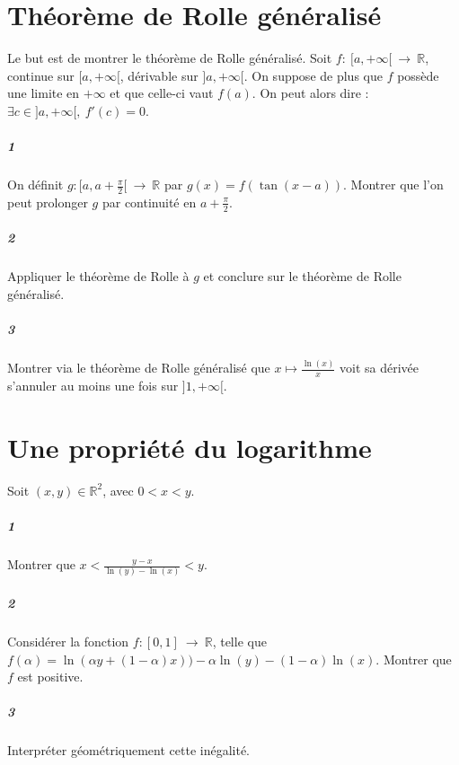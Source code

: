 \documentclass[10pt,a4paper]{article}
\begin{document}
\section{Théorème de Rolle généralisé}
Le but est de montrer le théorème de Rolle généralisé. Soit $f: \ [a,+\infty[ \ \rightarrow \ \mathbb{R}$, continue sur $[a,+\infty[$, dérivable sur $]a,+\infty[$. On suppose de plus que $f$ possède une limite en $+\infty$ et que celle-ci vaut $f(a)$. On peut alors dire : $\exists c \in ]a,+\infty[, \ f'(c)=0$.
\subparagraph{1}On définit $g : [a,a+\frac{\pi}{2}[ \ \rightarrow \ \mathbb{R}$ par $g(x)=f(\tan(x-a))$. Montrer que l'on peut prolonger $g$ par continuité en $a+\frac{\pi}{2}$.
\subparagraph{2}Appliquer le théorème de Rolle à $g$ et conclure sur le théorème de Rolle généralisé.
\subparagraph{3}Montrer via le théorème de Rolle généralisé que $x \mapsto \frac{\ln(x)}{x}$ voit sa dérivée s'annuler au moins une fois sur $]1,+\infty[$.

\section{Une propriété du logarithme}
Soit $(x,y)\in \mathbb{R}^2$, avec $0<x<y$.
\subparagraph{1}Montrer que $x < \frac{y-x}{\ln(y)-\ln(x)} <y$.
\subparagraph{2}Considérer la fonction $f:[0,1] \ \rightarrow \ \mathbb{R}$, telle que $f(\alpha)=\ln(\alpha y+(1-\alpha)x))-\alpha \ln(y) -(1-\alpha) \ln(x)$. Montrer que $f$ est positive.
\subparagraph{3}Interpréter géométriquement cette inégalité.
\end{document}
